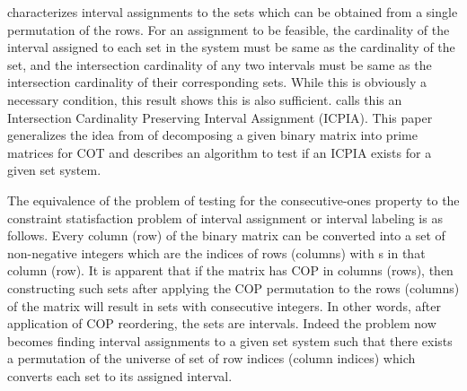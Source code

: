 \cite{nsnrs09} characterizes interval assignments to the sets which
can be obtained from a single permutation of the rows.  For an
assignment to be feasible, the cardinality of the interval assigned to
each set in the system must be same as the cardinality of the set, and
the intersection cardinality of any two intervals must be same as the
intersection cardinality of their corresponding sets.  While this is
obviously a necessary condition, this result shows this is also
sufficient.  \cite{nsnrs09} calls this an Intersection Cardinality
Preserving Interval Assignment (ICPIA).  This paper generalizes the
idea from \cite{wlh02} of decomposing a given binary matrix into prime
matrices for COT and describes an algorithm to test if an ICPIA exists
for a given set system.

The equivalence of the problem of testing for the consecutive-ones
property to the constraint statisfaction problem of interval
assignment \cite{nsnrs09} or interval labeling \cite{kklv10} is as
follows. Every column (row) of the binary matrix can be converted into
a set of non-negative integers which are the indices of rows (columns)
with {\un}s in that column (row). It is apparent that if the matrix
has COP in columns (rows), then constructing such sets after applying
the COP permutation to the rows (columns) of the matrix will result in
sets with consecutive integers. In other words, after application of
COP reordering, the sets are intervals. Indeed the problem now becomes
finding interval assignments to a given set system such that there
exists a permutation of the universe of set of row indices (column
indices) which converts each set to its assigned interval.

